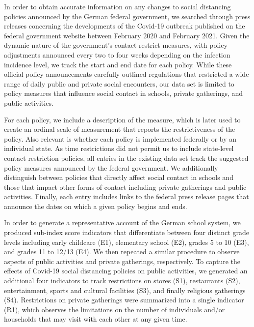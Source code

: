 In order to obtain accurate information on any changes to social distancing policies announced by the German federal government, we searched through press releases concerning the developments of the Covid-19 outbreak published on the federal government website between February 2020 and February 2021. Given the dynamic nature of the government’s contact restrict measures, with policy adjustments announced every two to four weeks depending on the infection incidence level, we track the start and end date for each policy. While these official policy announcements carefully outlined regulations that restricted a wide range of daily public and private social encounters, our data set is limited to policy measures that influence social contact in schools, private gatherings, and public activities.

For each policy, we include a description of the measure, which is later used to create an ordinal scale of measurement that reports the restrictiveness of the policy. Also relevant is whether each policy is implemented federally or by an individual state. As time restrictions did not permit us to include state-level contact restriction policies, all entries in the existing data set track the suggested policy measures announced by the federal government. We additionally distinguish between policies that directly affect social contact in schools and those that impact other forms of contact including private gatherings and public activities. Finally, each entry includes links to the federal press release pages that announce the dates on which a given policy begins and ends.

In order to generate a representative account of the German school system, we produced sub-index score indicators that differentiate between four distinct grade levels including early childcare (E1), elementary school (E2), grades 5 to 10 (E3), and grades 11 to 12/13 (E4). We then repeated a similar procedure to observe aspects of public activities and private gatherings, respectively. To capture the effects of Covid-19 social distancing policies on public activities, we generated an additional four indicators to track restrictions on stores (S1), restaurants (S2), entertainment, sports and cultural facilities (S3), and finally religious gatherings (S4). Restrictions on private gatherings were summarized into a single indicator (R1), which observes the limitations on the number of individuals and/or households that may visit with each other at any given time.

